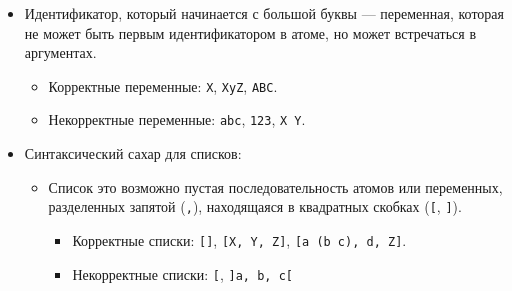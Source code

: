 \documentclass[12pt]{article}
\begin{document}
\begin{enumerate}
{\begin{itemize}
\begin{itemize}
          \begin{itemize}
            \item Корректные определения типов
            \begin{itemize}
              \item \verb!type filter (A -> o) -> list A -> list A -> o.!
              \item \verb!type fruit string -> o.!
            \end{itemize}
            \item Некорректные определения типов
            \begin{itemize}
              \item \verb!type type type -> type.! --- ключевое слово используется как идентификатор
              \item \verb!type x -> y -> z.! --- нет имени типа
              \item \verb!tupe x o.! --- идентификатор вместо ключевого слова \verb!type!
            \end{itemize}
          \end{itemize}
        \item Идентификатор, который начинается с большой буквы --- переменная, которая не может быть первым идентификатором в атоме, но может встречаться в аргументах.
        \begin{itemize}
          \item Корректные переменные: \verb!X!, \verb!XyZ!, \verb!ABC!.
          \item Некорректные переменные: \verb!abc!, \verb!123!, \verb!X Y!.
        \end{itemize}
        \item Синтаксический сахар для списков:
        \begin{itemize}
          \item Список это возможно пустая последовательность атомов или переменных, разделенных запятой (\verb!,!), находящаяся в квадратных скобках (\verb![!, \verb!]!).
          \begin{itemize}
            \item Корректные списки: \verb![]!, \verb![X, Y, Z]!, \verb![a (b c), d, Z]!.
            \item Некорректные списки: \verb![!, \verb!]a, b, c[!
          \end{itemize}


\end{itemize}
\end{itemize}
\end{itemize}}
\end{enumerate}
\end{document}
